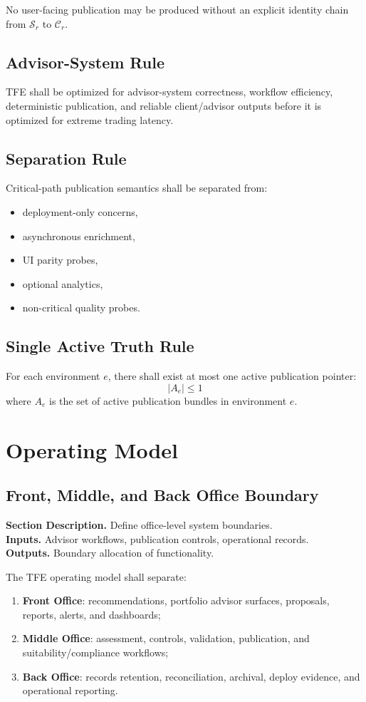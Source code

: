 \documentclass[11pt]{report}
\newcommand{\meta}[3]{\textbf{Section Description.} #1\\
\textbf{Inputs.} #2\\
\textbf{Outputs.} #3\par}
\begin{document}
No user-facing publication may be produced without an explicit identity chain from \(\mathcal{S}_r\) to \(\mathcal{C}_r\).

\section{Advisor-System Rule}
TFE shall be optimized for advisor-system correctness, workflow efficiency, deterministic publication, and reliable client/advisor outputs before it is optimized for extreme trading latency.

\section{Separation Rule}
Critical-path publication semantics shall be separated from:
\begin{itemize}
    \item deployment-only concerns,
    \item asynchronous enrichment,
    \item UI parity probes,
    \item optional analytics,
    \item non-critical quality probes.
\end{itemize}

\section{Single Active Truth Rule}
For each environment \(e\), there shall exist at most one active publication pointer:
\[
\left| A_e \right| \le 1
\]
where \(A_e\) is the set of active publication bundles in environment \(e\).
\chapter{Operating Model}
\section{Front, Middle, and Back Office Boundary}
\meta{Define office-level system boundaries.}{Advisor workflows, publication controls, operational records.}{Boundary allocation of functionality.}

The TFE operating model shall separate:
\begin{enumerate}[leftmargin=1.2cm]
    \item \textbf{Front Office}: recommendations, portfolio advisor surfaces, proposals, reports, alerts, and dashboards;
    \item \textbf{Middle Office}: assessment, controls, validation, publication, and suitability/compliance workflows;
    \item \textbf{Back Office}: records retention, reconciliation, archival, deploy evidence, and operational reporting.
\end{enumerate}
\end{document}

